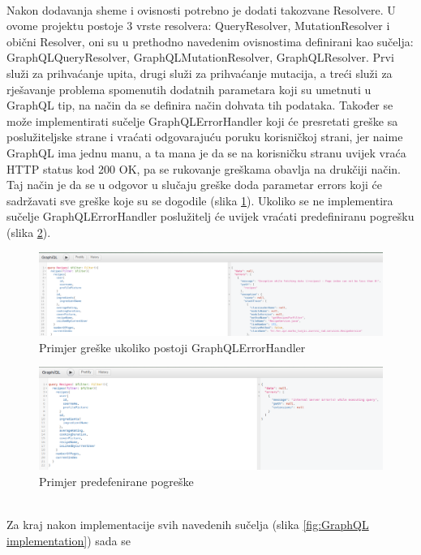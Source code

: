 \documentclass[times, utf8, zavrsni]{fer}
\begin{document}
\\
Nakon dodavanja sheme i ovisnosti potrebno je dodati takozvane Resolvere. U ovome projektu postoje 3 vrste resolvera:
QueryResolver, MutationResolver i obični Resolver, oni su u prethodno navedenim ovisnostima definirani kao sučelja:
GraphQLQueryResolver, GraphQLMutationResolver, GraphQLResolver. Prvi služi za prihvaćanje upita, drugi služi za prihvaćanje
mutacija, a treći služi za rješavanje problema spomenutih dodatnih parametara koji su umetnuti u GraphQL tip,
na način da se definira način dohvata tih podataka. Također se može implementirati sučelje GraphQLErrorHandler koji
će presretati greške sa poslužiteljske strane i vraćati odgovarajuću poruku korisničkoj strani, jer naime GraphQL
ima jednu manu, a ta mana je da se na korisničku stranu uvijek vraća HTTP status kod 200 OK, pa se rukovanje greškama
obavlja na drukčiji način. Taj način je da se u odgovor u slučaju greške doda parametar errors koji će sadržavati
sve greške koje su se dogodile (slika \ref{fig:Handled error}).
Ukoliko se ne implementira sučelje GraphQLErrorHandler poslužitelj će uvijek vraćati predefiniranu pogrešku (slika \ref{fig:Default error}). \\
\begin{figure}[h]
      \includegraphics[width=\textwidth]{graphql_handled_error.png}
      \caption{Primjer greške ukoliko postoji GraphQLErrorHandler}
      \label{fig:Handled error}
\end{figure}
\begin{figure}[h]
      \includegraphics[width=\textwidth]{graphql_default_error.png}
      \caption{Primjer predefenirane pogreške}
      \label{fig:Default error}
\end{figure}
\\
Za kraj nakon implementacije svih navedenih sučelja (slika \ref{fig:GraphQL implementation}) sada se
\end{document}
